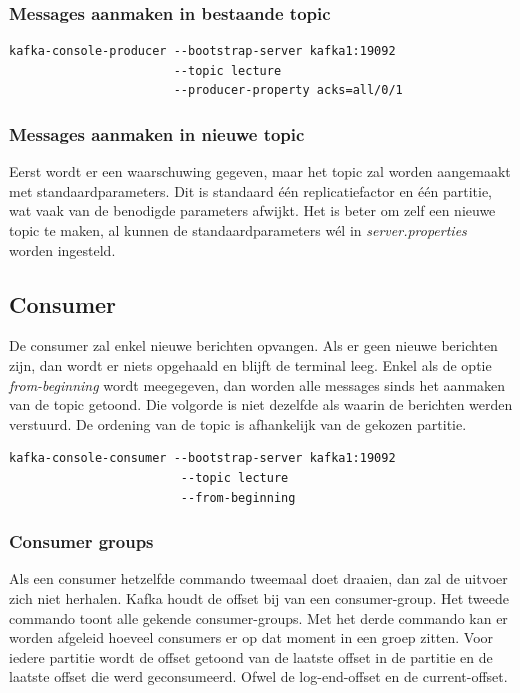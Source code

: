 \documentclass[a4paper,10pt,twoside]{report}
\begin{document}
\subsubsection{Messages aanmaken in bestaande topic}
\begin{lstlisting}[language=CLI-kafka]
kafka-console-producer --bootstrap-server kafka1:19092 
					   --topic lecture
					   --producer-property acks=all/0/1
\end{lstlisting}

\subsubsection{Messages aanmaken in nieuwe topic}

Eerst wordt er een waarschuwing gegeven, maar het topic zal worden aangemaakt met standaardparameters. Dit is standaard één replicatiefactor en één partitie, wat vaak van de benodigde parameters afwijkt. Het is beter om zelf een nieuwe topic te maken, al kunnen de standaardparameters wél in \textit{server.properties} worden ingesteld.

\subsection{Consumer}
De consumer zal enkel nieuwe berichten opvangen. Als er geen nieuwe berichten zijn, dan wordt er niets opgehaald en blijft de terminal leeg. Enkel als de optie \textit{from-beginning} wordt meegegeven, dan worden alle messages sinds het aanmaken van de topic getoond. Die volgorde is niet dezelfde als waarin de berichten werden verstuurd. De ordening van de topic is afhankelijk van de gekozen partitie.

\begin{lstlisting}[language=CLI-kafka]
kafka-console-consumer --bootstrap-server kafka1:19092
						--topic lecture
						--from-beginning
\end{lstlisting}

\subsubsection{Consumer groups}

Als een consumer hetzelfde commando tweemaal doet draaien, dan zal de uitvoer zich niet herhalen. Kafka houdt de offset bij van een consumer-group. Het tweede commando toont alle gekende consumer-groups. Met het derde commando kan er worden afgeleid hoeveel consumers er op dat moment in een groep zitten. Voor iedere partitie wordt de offset getoond van de laatste offset in de partitie en de laatste offset die werd geconsumeerd. Ofwel de log-end-offset en de current-offset.
\end{document}
